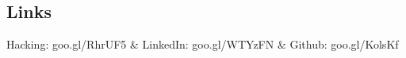 \documentclass[margin,line]{resume}
\begin{document}
\begin{resume}

\section{Links}
\begin{ncolumn}{3}
   \setlength\parsep{15pt}
   \small Hacking: goo.gl/RhrUF5 & \small LinkedIn: goo.gl/WTYzFN & \small Github: goo.gl/KolsKf
\end{ncolumn}

\end{resume}
\end{document}
